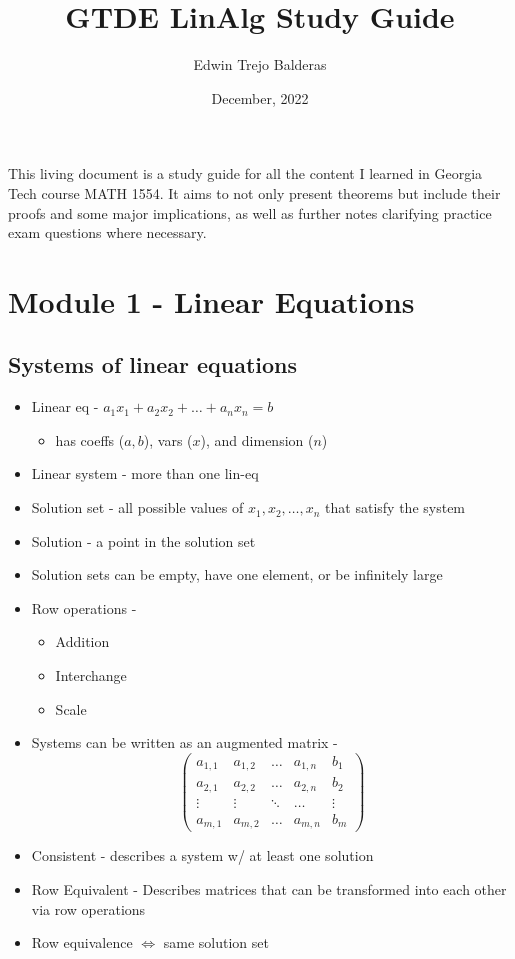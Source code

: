 \documentclass{article}
\title{GTDE LinAlg Study Guide}
\author{Edwin Trejo Balderas}
\date{December, 2022}
\begin{document}
\maketitle

This living document is a study guide for all the content I learned in Georgia Tech course MATH 1554. It aims to not only present theorems but include their proofs and some major implications, as well as further notes clarifying practice exam questions where necessary.

\section{Module 1 - Linear Equations}

\subsection{Systems of linear equations}
\begin{itemize}
    \item Linear eq - \(a_1x_1+a_2x_2+\dots +a_nx_n=b\)
    \begin{itemize}
        \item has coeffs (\(a,b\)), vars (\(x\)), and dimension (\(n\))
    \end{itemize}
    \item Linear system - more than one lin-eq 
    \item Solution set - all possible values of \(x_1,x_2,\dots,x_n\) that satisfy the system
    \item Solution - a point in the solution set 
    \item Solution sets can be empty, have one element, or be infinitely large 
    \item Row operations - 
    \begin{itemize}
        \item Addition
        \item Interchange 
        \item Scale
    \end{itemize}
    \item Systems can be written as an augmented matrix - 
    \[\begin{pmatrix} a_{1,1}&a_{1,2}&\dots&a_{1,n}&b_1 \\ 
        a_{2,1}&a_{2,2}&\dots&a_{2,n}&b_2 \\ 
        \vdots&\vdots&\ddots&\dots&\vdots \\ 
        a_{m,1}&a_{m,2}&\dots&a_{m,n}&b_m\end{pmatrix}\]
    \item Consistent - describes a system w/ at least one solution 
    \item Row Equivalent - Describes matrices that can be transformed into each other via row operations
    \item Row equivalence \(\Leftrightarrow\) same solution set 
\end{itemize}
\end{document}
